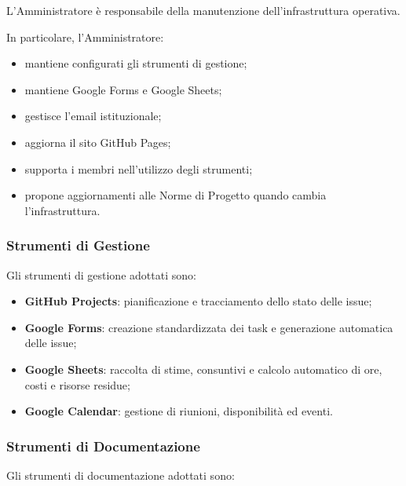 L'Amministratore è responsabile della manutenzione dell'infrastruttura operativa.

In particolare, l'Amministratore:

\begin{itemize}
    \item mantiene configurati gli strumenti di gestione;
    \item mantiene Google Forms e Google Sheets;
    \item gestisce l'email istituzionale;
    \item aggiorna il sito GitHub Pages;
    \item supporta i membri nell'utilizzo degli strumenti;
    \item propone aggiornamenti alle Norme di Progetto quando cambia l'infrastruttura.
\end{itemize}


\subsubsection{Strumenti di Gestione}

Gli strumenti di gestione adottati sono:

\begin{itemize}
    \item \textbf{GitHub Projects}: pianificazione e tracciamento dello stato delle
    issue;

    \item \textbf{Google Forms}: creazione standardizzata dei task e generazione
    automatica delle issue;

    \item \textbf{Google Sheets}: raccolta di stime, consuntivi e calcolo automatico
    di ore, costi e risorse residue;

    \item \textbf{Google Calendar}: gestione di riunioni, disponibilità ed eventi.
\end{itemize}


\subsubsection{Strumenti di Documentazione}

Gli strumenti di documentazione adottati sono:

